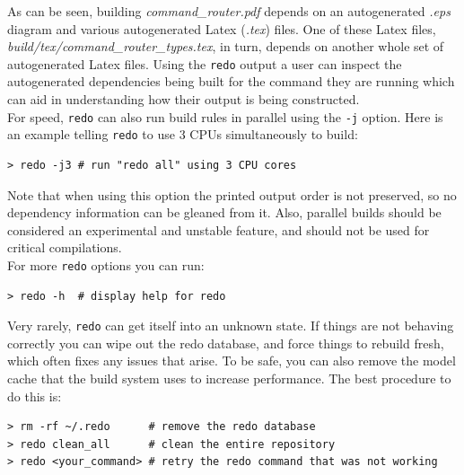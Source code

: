 As can be seen, building \textit{command\_router.pdf} depends on an autogenerated \textit{.eps} diagram and various autogenerated Latex (\textit{.tex}) files. One of these Latex files, \textit{build/tex/command\_router\_types.tex}, in turn, depends on another whole set of autogenerated Latex files. Using the \texttt{redo} output a user can inspect the autogenerated dependencies being built for the command they are running which can aid in understanding how their output is being constructed. \\

For speed, \texttt{redo} can also run build rules in parallel using the \texttt{-j} option. Here is an example telling \texttt{redo} to use 3 CPUs simultaneously to build:

\vspace{5mm} %
\begin{verbatim}
> redo -j3 # run "redo all" using 3 CPU cores
\end{verbatim}
\vspace{5mm} %

Note that when using this option the printed output order is not preserved, so no dependency information can be gleaned from it. Also, parallel builds should be considered an experimental and unstable feature, and should not be used for critical compilations. \\

For more \texttt{redo} options you can run:

\vspace{5mm} %
\begin{verbatim}
> redo -h  # display help for redo
\end{verbatim}
\vspace{5mm} %

Very rarely, \texttt{redo} can get itself into an unknown state. If things are not behaving correctly you can wipe out the redo database, and force things to rebuild fresh, which often fixes any issues that arise. To be safe, you can also remove the model cache that the build system uses to increase performance. The best procedure to do this is:

\vspace{5mm} %
\begin{verbatim}
> rm -rf ~/.redo      # remove the redo database
> redo clean_all      # clean the entire repository
> redo <your_command> # retry the redo command that was not working
\end{verbatim}
\vspace{5mm} %

